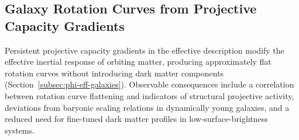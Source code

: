 \subsection{Galaxy Rotation Curves from Projective Capacity Gradients}
  \label{subsec:galaxy-rotation-chi}

  Persistent projective capacity gradients in the effective description
  modify the effective inertial response of orbiting matter, producing approximately
  flat rotation curves without introducing dark matter components
  (Section~\ref{subsec:phi-eff-galaxies}).
  Observable consequences include a correlation between rotation curve
  flattening and indicators of structural projective activity, deviations
  from baryonic scaling relations in dynamically young galaxies, and a
  reduced need for fine-tuned dark matter profiles in low-surface-brightness
  systems.
